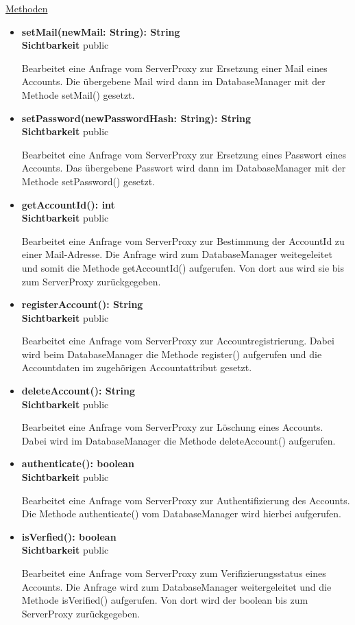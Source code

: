 \underline{Methoden}
\begin{itemize}
\itemsep0pt
\item \textbf{setMail(newMail: String): String}\hfill\\
\textbf{Sichtbarkeit} public

Bearbeitet eine Anfrage vom ServerProxy zur Ersetzung einer Mail eines Accounts. Die übergebene Mail wird dann im DatabaseManager mit der Methode setMail() gesetzt.

\item \textbf{setPassword(newPasswordHash: String): String}\hfill\\
\textbf{Sichtbarkeit} public

Bearbeitet eine Anfrage vom ServerProxy zur Ersetzung eines Passwort eines Accounts. Das übergebene Passwort wird dann im DatabaseManager mit der Methode setPassword() gesetzt.

\item \textbf{getAccountId(): int}\hfill\\
\textbf{Sichtbarkeit} public

Bearbeitet eine Anfrage vom ServerProxy zur Bestimmung der AccountId zu einer Mail-Adresse. Die Anfrage wird zum DatabaseManager weitegeleitet und somit die Methode getAccountId() aufgerufen. Von dort aus wird sie bis zum ServerProxy zurückgegeben.  

\item \textbf{registerAccount(): String}\hfill\\
\textbf{Sichtbarkeit} public

Bearbeitet eine Anfrage vom ServerProxy zur Accountregistrierung. Dabei wird beim DatabaseManager die Methode register() aufgerufen und die Accountdaten im zugehörigen Accountattribut gesetzt. 

\item \textbf{deleteAccount(): String}\hfill\\
\textbf{Sichtbarkeit} public

Bearbeitet eine Anfrage vom ServerProxy zur Löschung eines Accounts. Dabei wird im DatabaseManager die Methode deleteAccount() aufgerufen.

\item \textbf{authenticate(): boolean}\hfill\\
\textbf{Sichtbarkeit} public

Bearbeitet eine Anfrage vom ServerProxy zur Authentifizierung des Accounts. Die Methode authenticate() vom DatabaseManager wird hierbei aufgerufen.
 
\item \textbf{isVerfied(): boolean}\hfill\\
\textbf{Sichtbarkeit} public

Bearbeitet eine Anfrage vom ServerProxy zum Verifizierungsstatus eines Accounts. Die Anfrage wird zum DatabaseManager weitergeleitet und die Methode isVerified() aufgerufen. Von dort wird der boolean bis zum ServerProxy zurückgegeben.
\end{itemize}